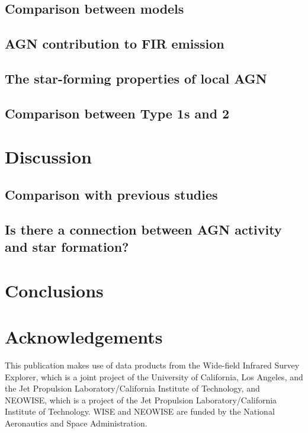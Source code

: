 \documentclass[fleqn,usenatbib]{mnras}
\begin{document}
\subsection{Comparison between models}
\subsection{AGN contribution to FIR emission}
\subsection{The star-forming properties of local AGN}
\subsection{Comparison between Type 1s and 2}

\section{Discussion}
\subsection{Comparison with previous studies}
\subsection{Is there a connection between AGN activity and star formation?}

\section{Conclusions}

\section*{Acknowledgements}
This publication makes use of data products from the Wide-field Infrared Survey Explorer, which is a joint project of the University of California, Los Angeles, and the Jet Propulsion Laboratory/California Institute of Technology, and NEOWISE, which is a project of the Jet Propulsion Laboratory/California Institute of Technology. WISE and NEOWISE are funded by the National Aeronautics and Space Administration.


\end{document}
